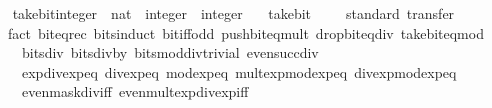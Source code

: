 \begin{isabellebody}
\isadelimproof
\ %
\endisadelimproof
%
\isatagproof
\isacommand{{\isachardot}{\kern0pt}}\isamarkupfalse%
%
\endisatagproof
{\isafoldproof}%
%
\isadelimproof
%
\endisadelimproof
\isanewline
\isanewline
{}\isamarkupfalse%
\ take{\isacharunderscore}{\kern0pt}bit{\isacharunderscore}{\kern0pt}integer\ {\isacharcolon}{\kern0pt}{\isacharcolon}{\kern0pt}\ {\isacartoucheopen}nat\ {\isasymRightarrow}\ integer\ {\isasymRightarrow}\ integer{\isacartoucheclose}\isanewline
\ \ \ take{\isacharunderscore}{\kern0pt}bit%
\isadelimproof
\ %
\endisadelimproof
%
\isatagproof
\isacommand{{\isachardot}{\kern0pt}}\isamarkupfalse%
%
\endisatagproof
{\isafoldproof}%
%
\isadelimproof
%
\endisadelimproof
\isanewline
\isanewline
{}\isamarkupfalse%
%
\isadelimproof
\ %
\endisadelimproof
%
\isatagproof
{}\isamarkupfalse%
\ {\isacharparenleft}{\kern0pt}standard{\isacharsemicolon}{\kern0pt}\ transfer{\isacharparenright}{\kern0pt}\isanewline
\ \ {\isacharparenleft}{\kern0pt}fact\ bit{\isacharunderscore}{\kern0pt}eq{\isacharunderscore}{\kern0pt}rec\ bits{\isacharunderscore}{\kern0pt}induct\ bit{\isacharunderscore}{\kern0pt}iff{\isacharunderscore}{\kern0pt}odd\ push{\isacharunderscore}{\kern0pt}bit{\isacharunderscore}{\kern0pt}eq{\isacharunderscore}{\kern0pt}mult\ drop{\isacharunderscore}{\kern0pt}bit{\isacharunderscore}{\kern0pt}eq{\isacharunderscore}{\kern0pt}div\ take{\isacharunderscore}{\kern0pt}bit{\isacharunderscore}{\kern0pt}eq{\isacharunderscore}{\kern0pt}mod\isanewline
\ \ \ \ bits{\isacharunderscore}{\kern0pt}div{\isacharunderscore}{\kern0pt}{}\ bits{\isacharunderscore}{\kern0pt}div{\isacharunderscore}{\kern0pt}by{\isacharunderscore}{\kern0pt}{}\ bits{\isacharunderscore}{\kern0pt}mod{\isacharunderscore}{\kern0pt}div{\isacharunderscore}{\kern0pt}trivial\ even{\isacharunderscore}{\kern0pt}succ{\isacharunderscore}{\kern0pt}div{\isacharunderscore}{\kern0pt}{}\isanewline
\ \ \ \ exp{\isacharunderscore}{\kern0pt}div{\isacharunderscore}{\kern0pt}exp{\isacharunderscore}{\kern0pt}eq\ div{\isacharunderscore}{\kern0pt}exp{\isacharunderscore}{\kern0pt}eq\ mod{\isacharunderscore}{\kern0pt}exp{\isacharunderscore}{\kern0pt}eq\ mult{\isacharunderscore}{\kern0pt}exp{\isacharunderscore}{\kern0pt}mod{\isacharunderscore}{\kern0pt}exp{\isacharunderscore}{\kern0pt}eq\ div{\isacharunderscore}{\kern0pt}exp{\isacharunderscore}{\kern0pt}mod{\isacharunderscore}{\kern0pt}exp{\isacharunderscore}{\kern0pt}eq\isanewline
\ \ \ \ even{\isacharunderscore}{\kern0pt}mask{\isacharunderscore}{\kern0pt}div{\isacharunderscore}{\kern0pt}iff\ even{\isacharunderscore}{\kern0pt}mult{\isacharunderscore}{\kern0pt}exp{\isacharunderscore}{\kern0pt}div{\isacharunderscore}{\kern0pt}exp{\isacharunderscore}{\kern0pt}iff\isanewline

\end{isabellebody}
